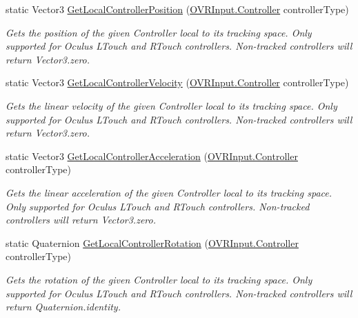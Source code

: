 \begin{DoxyCompactItemize}
static Vector3 \mbox{\hyperlink{class_o_v_r_input_aaf856370bc93d972ca00b9777e137493}{Get\+Local\+Controller\+Position}} (\mbox{\hyperlink{class_o_v_r_input_a5c86f9052a9cbb0b73779ff5704d60a8}{O\+V\+R\+Input.\+Controller}} controller\+Type)
\begin{DoxyCompactList}\small\item\em Gets the position of the given Controller local to its tracking space. Only supported for Oculus L\+Touch and R\+Touch controllers. Non-\/tracked controllers will return Vector3.\+zero. \end{DoxyCompactList}\item 
static Vector3 \mbox{\hyperlink{class_o_v_r_input_a284d11ad0469f2b1e04447e2d6a26bd4}{Get\+Local\+Controller\+Velocity}} (\mbox{\hyperlink{class_o_v_r_input_a5c86f9052a9cbb0b73779ff5704d60a8}{O\+V\+R\+Input.\+Controller}} controller\+Type)
\begin{DoxyCompactList}\small\item\em Gets the linear velocity of the given Controller local to its tracking space. Only supported for Oculus L\+Touch and R\+Touch controllers. Non-\/tracked controllers will return Vector3.\+zero. \end{DoxyCompactList}\item 
static Vector3 \mbox{\hyperlink{class_o_v_r_input_a3d20bf824d737b85497fab8442638864}{Get\+Local\+Controller\+Acceleration}} (\mbox{\hyperlink{class_o_v_r_input_a5c86f9052a9cbb0b73779ff5704d60a8}{O\+V\+R\+Input.\+Controller}} controller\+Type)
\begin{DoxyCompactList}\small\item\em Gets the linear acceleration of the given Controller local to its tracking space. Only supported for Oculus L\+Touch and R\+Touch controllers. Non-\/tracked controllers will return Vector3.\+zero. \end{DoxyCompactList}\item 
static Quaternion \mbox{\hyperlink{class_o_v_r_input_ae2f486b9046928c9e82bf8cbc68054e6}{Get\+Local\+Controller\+Rotation}} (\mbox{\hyperlink{class_o_v_r_input_a5c86f9052a9cbb0b73779ff5704d60a8}{O\+V\+R\+Input.\+Controller}} controller\+Type)
\begin{DoxyCompactList}\small\item\em Gets the rotation of the given Controller local to its tracking space. Only supported for Oculus L\+Touch and R\+Touch controllers. Non-\/tracked controllers will return Quaternion.\+identity. \end{DoxyCompactList}\item 

\end{DoxyCompactItemize}
